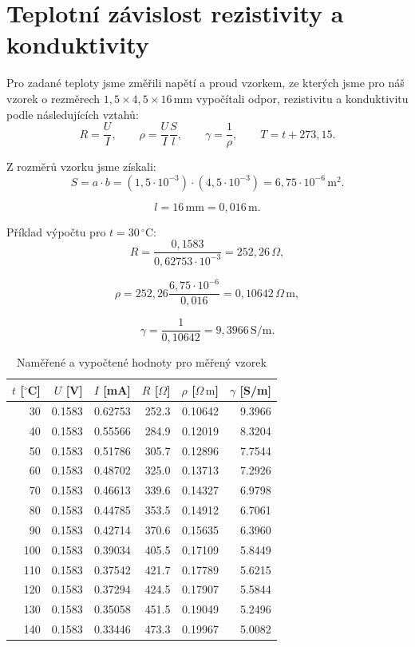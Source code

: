 \documentclass[11pt,a4paper]{article}
\renewcommand{\arraystretch}{1.35}
\begin{document}
\section{Teplotní závislost rezistivity a konduktivity}
Pro zadané teploty jsme změřili napětí a proud vzorkem, ze kterých jsme pro náš vzorek o rezměrech $1{,}5\times4{,}5\times16\,\mathrm{mm}$ vypočítali odpor, rezistivitu a konduktivitu podle následujících vztahů:
$$
R=\frac{U}{I},\qquad \rho=\frac{U}{I}\frac{S}{l},\qquad
\gamma=\frac{1}{\rho},\qquad T=t+273{,}15.
$$

Z rozměrů vzorku jsme získali:
\[
S = a \cdot b
= (1{,}5 \cdot 10^{-3}) \cdot (4{,}5 \cdot 10^{-3})
= 6{,}75 \cdot 10^{-6}\,\mathrm{m^2}.
\]

\[
l = 16\,\mathrm{mm} = 0{,}016\,\mathrm{m}.
\]

Příklad výpočtu pro $t=30\,^{\circ}\mathrm C$:
\[
R=\frac{0{,}1583}{0{,}62753\cdot10^{-3}}
=252{,}26\,\Omega,
\]

\[
\rho=252{,}26\frac{6{,}75\cdot10^{-6}}{0{,}016}
=0{,}10642\,\Omega\,\mathrm m,
\]

\[
\gamma=\frac{1}{0{,}10642}
=9{,}3966\,\mathrm{S/m}.
\]

\begin{table}[H]
\centering
\caption{Naměřené a vypočtené hodnoty pro měřený vzorek}
\small
\setlength{\tabcolsep}{5pt}
\renewcommand{\arraystretch}{1.42}
\begin{tabular}{|r|r|r|r|r|r|}
\hline
$t$ [$^\circ$C] & $U$ [V] & $I$ [mA] & $R$ [$\Omega$] &
$\rho$ [$\Omega\,\mathrm m$] & $\gamma$ [S/m] \\
\hline
30  & 0.1583 & 0.62753 & 252.3 & 0.10642 & 9.3966 \\ \hline
40  & 0.1583 & 0.55566 & 284.9 & 0.12019 & 8.3204 \\ \hline
50  & 0.1583 & 0.51786 & 305.7 & 0.12896 & 7.7544 \\ \hline
60  & 0.1583 & 0.48702 & 325.0 & 0.13713 & 7.2926 \\ \hline
70  & 0.1583 & 0.46613 & 339.6 & 0.14327 & 6.9798 \\ \hline
80  & 0.1583 & 0.44785 & 353.5 & 0.14912 & 6.7061 \\ \hline
90  & 0.1583 & 0.42714 & 370.6 & 0.15635 & 6.3960 \\ \hline
100 & 0.1583 & 0.39034 & 405.5 & 0.17109 & 5.8449 \\ \hline
110 & 0.1583 & 0.37542 & 421.7 & 0.17789 & 5.6215 \\ \hline
120 & 0.1583 & 0.37294 & 424.5 & 0.17907 & 5.5844 \\ \hline
130 & 0.1583 & 0.35058 & 451.5 & 0.19049 & 5.2496 \\ \hline
140 & 0.1583 & 0.33446 & 473.3 & 0.19967 & 5.0082 \\
\hline
\end{tabular}
\end{table}
\end{document}
